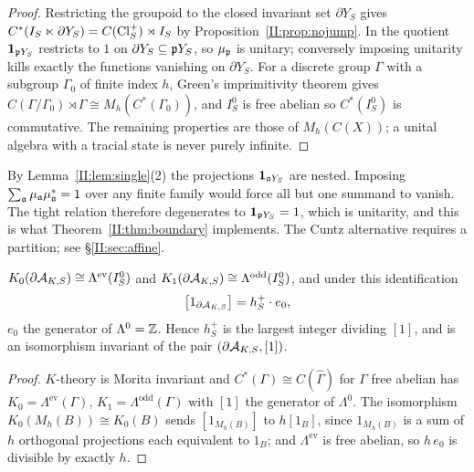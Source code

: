 \begin{proof}
Restricting the groupoid to the closed invariant set $\partial Y_S$ gives
$C^*(I_S\ltimes\partial Y_S)=C(\operatorname{Cl}^+_S)\rtimes I_S$ by Proposition~\ref{II:prop:nojump}. In the
quotient $\mathbf 1_{\mathfrak{p} Y_S}$ restricts to $1$ on $\partial Y_S\subseteq\mathfrak{p} Y_S$, so
$\mu_{\mathfrak{p}}$ is unitary; conversely imposing unitarity kills exactly the functions vanishing on
$\partial Y_S$. For a discrete group $\Gamma$ with a subgroup $\Gamma_0$ of finite index $h$,
Green's imprimitivity theorem \cite{Green} gives $C(\Gamma/\Gamma_0)\rtimes\Gamma\cong M_h(C^*(\Gamma_0))$,
and $I_S^0$ is free abelian so $C^*(I_S^0)$ is commutative. The remaining properties are
those of $M_h(C(X))$; a unital algebra with a tracial state is never purely infinite.
\end{proof}

\begin{remark}\label{II:rem:nocuntz}
By Lemma~\ref{II:lem:single}(2) the projections $\mathbf 1_{\mathfrak{a} Y_S}$ are nested. Imposing
$\sum_{\mathfrak{a}}\mu_{\mathfrak{a}}\mu_{\mathfrak{a}}^*=1$ over any finite family would force all but one summand to
vanish. The tight relation therefore degenerates to $\mathbf 1_{\mathfrak{p} Y_S}=1$, which is
unitarity, and this is what Theorem~\ref{II:thm:boundary} implements. The Cuntz alternative
requires a partition; see \S\ref{II:sec:affine}.
\end{remark}

\begin{theorem}\label{II:thm:Kboundary}
$K_0(\partial\mathcal{A}_{K,S})\cong\Lambda^{\mathrm{ev}}(I_S^0)$ and
$K_1(\partial\mathcal{A}_{K,S})\cong\Lambda^{\mathrm{odd}}(I_S^0)$, and under this identification
\begin{equation}\label{II:eq:unit}
\bigl[1_{\partial\mathcal{A}_{K,S}}\bigr]=h^+_S\cdot e_0 ,
\end{equation}
$e_0$ the generator of $\Lambda^0=\mathbb{Z}$. Hence $h^+_S$ is the largest integer dividing $[1]$,
and is an isomorphism invariant of the pair $(\partial\mathcal{A}_{K,S},[1])$.
\end{theorem}

\begin{proof}
$K$-theory is Morita invariant and $C^*(\Gamma)\cong C(\widehat\Gamma)$ for $\Gamma$ free
abelian has $K_0=\Lambda^{\mathrm{ev}}(\Gamma)$, $K_1=\Lambda^{\mathrm{odd}}(\Gamma)$ with
$[1]$ the generator of $\Lambda^0$. The isomorphism $K_0(M_h(B))\cong K_0(B)$ sends
$[1_{M_h(B)}]$ to $h[1_B]$, since $1_{M_h(B)}$ is a sum of $h$ orthogonal projections each
equivalent to $1_B$; and $\Lambda^{\mathrm{ev}}$ is free abelian, so $h\,e_0$ is divisible by
exactly $h$.
\end{proof}

